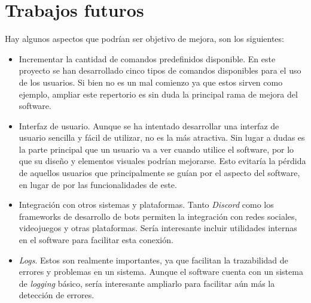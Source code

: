 \section{Trabajos futuros}

Hay algunos aspectos que podrían ser objetivo de mejora, son los siguientes:

\begin{itemize}
	\item Incrementar la cantidad de comandos predefinidos disponible. En este proyecto se han desarrollado cinco tipos de comandos disponibles para el uso de los usuarios. Si bien no es un mal comienzo ya que estos sirven como ejemplo, ampliar este repertorio es sin duda la principal rama de mejora del software.
	\item Interfaz de usuario. Aunque se ha intentado desarrollar una interfaz de usuario sencilla y fácil de utilizar, no es la más atractiva. Sin lugar a dudas es la parte principal que un usuario va a ver cuando utilice el software, por lo que su diseño y elementos visuales podrían mejorarse. Esto evitaría la pérdida de aquellos usuarios que principalmente se guían por el aspecto del software, en lugar de por las funcionalidades de este.
	\item Integración con otros sistemas y plataformas. Tanto \textit{Discord} como los frameworks de desarrollo de bots permiten la integración con redes sociales, videojuegos y otras plataformas. Sería interesante incluir utilidades internas en el software para facilitar esta conexión.
	\item \textit{Logs}. Estos son realmente importantes, ya que facilitan la trazabilidad de errores y problemas en un sistema. Aunque el software cuenta con un sistema de \textit{logging} básico, sería interesante ampliarlo para facilitar aún más la detección de errores.
\end{itemize}
